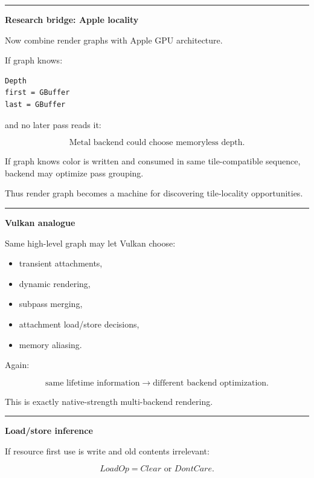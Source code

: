 \begin{center}\rule{0.5\linewidth}{0.5pt}\end{center}

\textbf{Research bridge: Apple locality}

Now combine render graphs with Apple GPU architecture.

If graph knows:

\begin{verbatim}
Depth
first = GBuffer
last = GBuffer
\end{verbatim}

and no later pass reads it:

\[
\boxed{
\text{Metal backend could choose memoryless depth}.
}
\]

If graph knows color is written and consumed in same tile-compatible sequence, backend may optimize pass grouping.

Thus render graph becomes a machine for discovering tile-locality opportunities.

\begin{center}\rule{0.5\linewidth}{0.5pt}\end{center}

\textbf{Vulkan analogue}

Same high-level graph may let Vulkan choose:

\begin{itemize}
\tightlist
\item
  transient attachments,
\item
  dynamic rendering,
\item
  subpass merging,
\item
  attachment load/store decisions,
\item
  memory aliasing.
\end{itemize}

Again:

\[
\boxed{
\text{same lifetime information}
\rightarrow
\text{different backend optimization}.
}
\]

This is exactly native-strength multi-backend rendering.

\begin{center}\rule{0.5\linewidth}{0.5pt}\end{center}

\textbf{Load/store inference}

If resource first use is write and old contents irrelevant:

\[
LoadOp=
Clear
\text{ or }
DontCare.
\]

